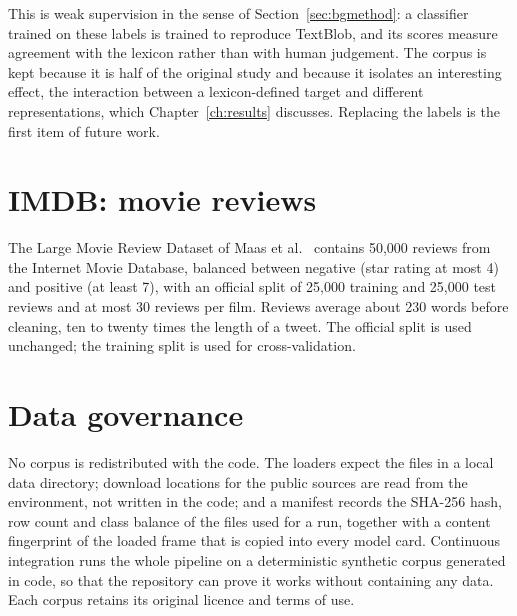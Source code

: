 This is weak supervision in the sense of Section~\ref{sec:bgmethod}: a classifier trained on these labels is trained to reproduce TextBlob, and its scores measure agreement with the lexicon rather than with human judgement. The corpus is kept because it is half of the original study and because it isolates an interesting effect, the interaction between a lexicon-defined target and different representations, which Chapter~\ref{ch:results} discusses. Replacing the labels is the first item of future work.

\section{IMDB: movie reviews}
The Large Movie Review Dataset of Maas et al.~\cite{maas2011} contains 50,000 reviews from the Internet Movie Database, balanced between negative (star rating at most 4) and positive (at least 7), with an official split of 25,000 training and 25,000 test reviews and at most 30 reviews per film. Reviews average about 230 words before cleaning, ten to twenty times the length of a tweet. The official split is used unchanged; the training split is used for cross-validation.

\section{Data governance}
No corpus is redistributed with the code. The loaders expect the files in a local data directory; download locations for the public sources are read from the environment, not written in the code; and a manifest records the SHA-256 hash, row count and class balance of the files used for a run, together with a content fingerprint of the loaded frame that is copied into every model card. Continuous integration runs the whole pipeline on a deterministic synthetic corpus generated in code, so that the repository can prove it works without containing any data. Each corpus retains its original licence and terms of use.
